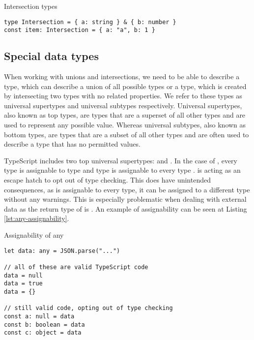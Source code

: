 \begin{listing}[ht]
  \caption{Intersection types}\label{lst:intersection-types}
  \begin{verbatim}
type Intersection = { a: string } & { b: number }
const item: Intersection = { a: "a", b: 1 }
  \end{verbatim}
\end{listing}

\subsection{Special data types}

When working with unions and intersections, we need to be able to describe a type, which can describe a union of all possible types or a type, which is created by intersecting two types with no related properties. We refer to these types as universal supertypes and universal subtypes respectively. Universal supertypes, also known as top types, are types that are a superset of all other types and are used to represent any possible value. Whereas universal subtypes, also known as bottom types, are types that are a subset of all other types and are often used to describe a type that has no permitted values.

TypeScript includes two top universal supertypes:  and . In the case of , every type is assignable to type  and type  is assignable to every type \cite{TopTypesAny}.  is acting as an escape hatch to opt out of type checking. This does have unintended consequences, as  is assignable to every type, it can be assigned to a different type without any warnings. This is especially problematic when dealing with external data as the return type of  is . An example of assignability can be seen at Listing \ref{lst:any-assignability}.

\begin{listing}[ht]
  \caption{Assignability of any}\label{lst:any-assignability}
  \begin{verbatim}
let data: any = JSON.parse("...") 

// all of these are valid TypeScript code
data = null
data = true
data = {}

// still valid code, opting out of type checking
const a: null = data
const b: boolean = data
const c: object = data
  \end{verbatim}
\end{listing}

